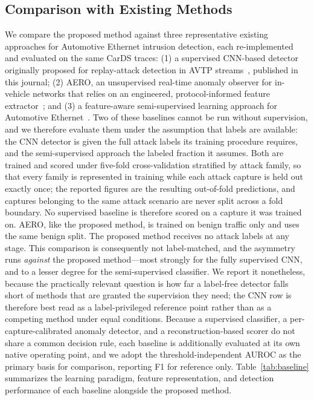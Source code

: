\subsection{Comparison with Existing Methods}
\label{sec:baseline}
We compare the proposed method against three representative existing approaches for Automotive Ethernet intrusion detection, each re-implemented and evaluated on the same CarDS traces: (1) a supervised CNN-based detector originally proposed for replay-attack detection in AVTP streams~\cite{jeong2021convolutional}, published in this journal; (2) AERO, an unsupervised real-time anomaly observer for in-vehicle networks that relies on an engineered, protocol-informed feature extractor~\cite{jeong2023aero}; and (3) a feature-aware semi-supervised learning approach for Automotive Ethernet~\cite{shibly2023feature}. Two of these baselines cannot be run without supervision, and we therefore evaluate them under the assumption that labels are available: the CNN detector is given the full attack labels its training procedure requires, and the semi-supervised approach the labeled fraction it assumes. Both are trained and scored under five-fold cross-validation stratified by attack family, so that every family is represented in training while each attack capture is held out exactly once; the reported figures are the resulting out-of-fold predictions, and captures belonging to the same attack scenario are never split across a fold boundary. No supervised baseline is therefore scored on a capture it was trained on. AERO, like the proposed method, is trained on benign traffic only and uses the same benign split. The proposed method receives no attack labels at any stage. This comparison is consequently not label-matched, and the asymmetry runs \emph{against} the proposed method---most strongly for the fully supervised CNN, and to a lesser degree for the semi-supervised classifier. We report it nonetheless, because the practically relevant question is how far a label-free detector falls short of methods that are granted the supervision they need; the CNN row is therefore best read as a label-privileged reference point rather than as a competing method under equal conditions. Because a supervised classifier, a per-capture-calibrated anomaly detector, and a reconstruction-based scorer do not share a common decision rule, each baseline is additionally evaluated at its own native operating point, and we adopt the threshold-independent AUROC as the primary basis for comparison, reporting F1 for reference only. Table~\ref{tab:baseline} summarizes the learning paradigm, feature representation, and detection performance of each baseline alongside the proposed method.


